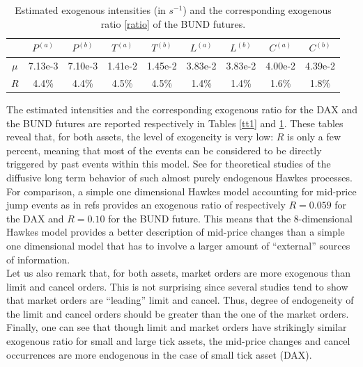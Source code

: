 \documentclass[a4paper,11pt]{article}
\newcommand{\PA}{P^{(a)}}
\newcommand{\PB}{P^{(b)}}
\newcommand{\TA}{T^{(a)}}
\newcommand{\TB}{T^{(b)}}
\newcommand{\CA}{C^{(a)}}
\newcommand{\CB}{C^{(b)}}
\newcommand{\LA}{L^{(a)}}
\newcommand{\LB}{L^{(b)}}
\begin{document}
\begin{table}[H]
\begin{center}
\begin{tabular}{|c|c|c|c|c|c|c|c|c|}
\hline
&$\PA$&$\PB$&$\TA$&$\TB$&$\LA$&$\LB$&$\CA$&$\CB$\\
\hline
$\mu$&7.13e-3 & 7.10e-3 & 1.41e-2 & 1.45e-2 & 3.83e-2 & 3.83e-2 & 4.00e-2 & 4.39e-2 \\
\hline
$R $&4.4\% & 4.4\% & 4.5\% & 4.5\% & 1.4\% & 1.4\% & 1.6\% & 1.8\% \\
\hline
\end{tabular}
\end{center}
\caption{Estimated exogenous intensities (in $s^{-1}$) and the corresponding exogenous ratio \eqref{ratio} of the BUND futures.}
\label{tt2}
\end{table}
\noindent The estimated intensities and the corresponding exogenous ratio for the DAX and the BUND futures are reported
respectively in Tables \ref{tt1} and \ref{tt2}.
These tables reveal that, for both assets, the level of exogeneity is very low:
$R$ is only a few percent, meaning that most of
the events can be considered to be directly triggered by past events within this model.
See \cite{jaisson2013limit,jaisson2014fractional} for theoretical studies of the diffusive long term behavior of such almost purely endogenous Hawkes processes.
For comparison, a simple one dimensional Hawkes model accounting for mid-price jump events as in refs \cite{filimonov2012quantifying} provides an exogenous ratio of respectively $R = 0.059$ for the DAX and $R = 0.10$ for the BUND future. This means that the 8-dimensional Hawkes model provides a better description of mid-price changes than a simple one dimensional model that has to involve a larger amount of ``external'' sources of information.\\


\noindent Let us also remark that, for both assets, market orders are more exogenous than limit and cancel orders. This is not surprising since several studies tend to show that market orders are ``leading'' limit and cancel.  Thus, degree of endogeneity of the limit and cancel orders should be greater than the one of the market orders.\\


\noindent Finally, one can see that though limit and market orders have strikingly
similar exogenous ratio for small and large tick assets, the mid-price changes
and cancel occurrences are more endogenous in the case of small tick asset (DAX).
\end{document}
